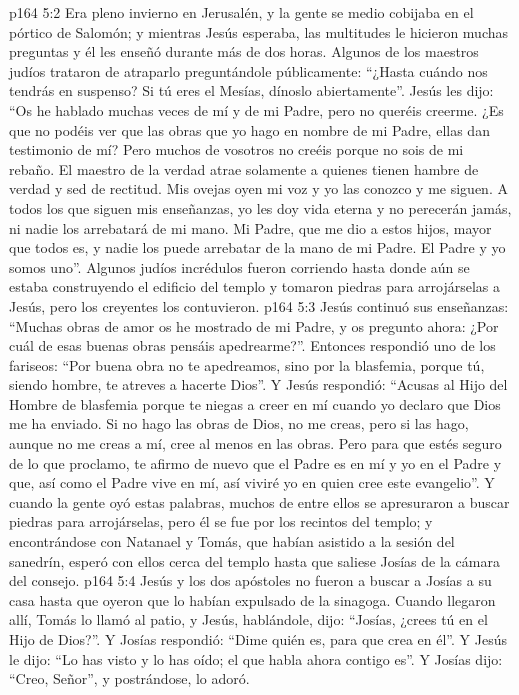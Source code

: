 \vs p164 5:2 Era pleno invierno en Jerusalén, y la gente se medio cobijaba en el pórtico de Salomón; y mientras Jesús esperaba, las multitudes le hicieron muchas preguntas y él les enseñó durante más de dos horas. Algunos de los maestros judíos trataron de atraparlo preguntándole públicamente: “¿Hasta cuándo nos tendrás en suspenso? Si tú eres el Mesías, dínoslo abiertamente”. Jesús les dijo: “Os he hablado muchas veces de mí y de mi Padre, pero no queréis creerme. ¿Es que no podéis ver que las obras que yo hago en nombre de mi Padre, ellas dan testimonio de mí? Pero muchos de vosotros no creéis porque no sois de mi rebaño. El maestro de la verdad atrae solamente a quienes tienen hambre de verdad y sed de rectitud. Mis ovejas oyen mi voz y yo las conozco y me siguen. A todos los que siguen mis enseñanzas, yo les doy vida eterna y no perecerán jamás, ni nadie los arrebatará de mi mano. Mi Padre, que me dio a estos hijos, mayor que todos es, y nadie los puede arrebatar de la mano de mi Padre. El Padre y yo somos uno”. Algunos judíos incrédulos fueron corriendo hasta donde aún se estaba construyendo el edificio del templo y tomaron piedras para arrojárselas a Jesús, pero los creyentes los contuvieron.
\vs p164 5:3 Jesús continuó sus enseñanzas: “Muchas obras de amor os he mostrado de mi Padre, y os pregunto ahora: ¿Por cuál de esas buenas obras pensáis apedrearme?”. Entonces respondió uno de los fariseos: “Por buena obra no te apedreamos, sino por la blasfemia, porque tú, siendo hombre, te atreves a hacerte Dios”. Y Jesús respondió: “Acusas al Hijo del Hombre de blasfemia porque te niegas a creer en mí cuando yo declaro que Dios me ha enviado. Si no hago las obras de Dios, no me creas, pero si las hago, aunque no me creas a mí, cree al menos en las obras. Pero para que estés seguro de lo que proclamo, te afirmo de nuevo que el Padre es en mí y yo en el Padre y que, así como el Padre vive en mí, así viviré yo en quien cree este evangelio”. Y cuando la gente oyó estas palabras, muchos de entre ellos se apresuraron a buscar piedras para arrojárselas, pero él se fue por los recintos del templo; y encontrándose con Natanael y Tomás, que habían asistido a la sesión del sanedrín, esperó con ellos cerca del templo hasta que saliese Josías de la cámara del consejo.
\vs p164 5:4 Jesús y los dos apóstoles no fueron a buscar a Josías a su casa hasta que oyeron que lo habían expulsado de la sinagoga. Cuando llegaron allí, Tomás lo llamó al patio, y Jesús, hablándole, dijo: “Josías, ¿crees tú en el Hijo de Dios?”. Y Josías respondió: “Dime quién es, para que crea en él”. Y Jesús le dijo: “Lo has visto y lo has oído; el que habla ahora contigo es”. Y Josías dijo: “Creo, Señor”, y postrándose, lo adoró.
